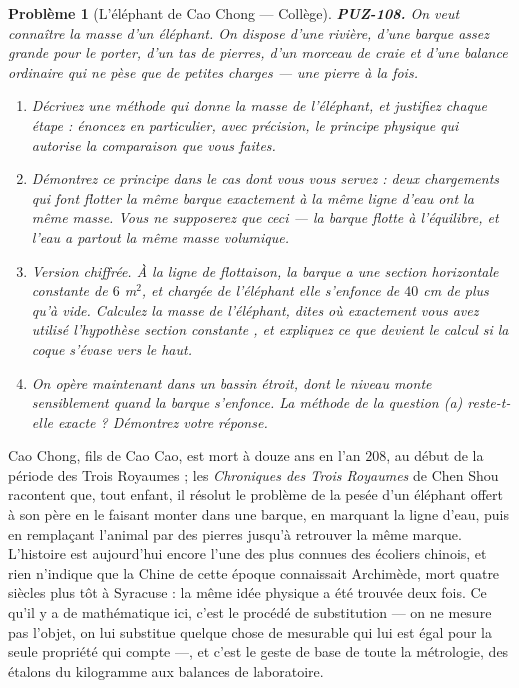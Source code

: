 \documentclass[11pt]{article}
\newtheorem{problem}{Problème}
\begin{document}
\begin{problem}[{L'éléphant de Cao Chong --- Collège}]
\textbf{PUZ-108.} On veut connaître la masse d'un éléphant. On dispose d'une rivière, d'une
barque assez grande pour le porter, d'un tas de pierres, d'un morceau de craie et d'une
balance ordinaire qui ne pèse que de petites charges --- une pierre à la fois.
\begin{enumerate}
\item[(a)] Décrivez une méthode qui donne la masse de l'éléphant, et justifiez chaque étape : énoncez
en particulier, avec précision, le principe physique qui autorise la comparaison que vous
faites.
\item[(b)] Démontrez ce principe dans le cas dont vous vous servez : deux chargements qui font
flotter la même barque exactement à la même ligne d'eau ont la même masse. Vous ne supposerez
que ceci --- la barque flotte à l'équilibre, et l'eau a partout la même masse volumique.
\item[(c)] Version chiffrée. À la ligne de flottaison, la barque a une section horizontale constante
de $ 6 $ m$^2$, et chargée de l'éléphant elle s'enfonce de $ 40 $ cm de plus qu'à vide.
Calculez la masse de l'éléphant, dites où exactement vous avez utilisé l'hypothèse \og{} section
constante \fg{}, et expliquez ce que devient le calcul si la coque s'évase vers le haut.
\item[(d)] On opère maintenant dans un bassin étroit, dont le niveau monte sensiblement quand la
barque s'enfonce. La méthode de la question (a) reste-t-elle exacte ? Démontrez votre
réponse.
\end{enumerate}

\end{problem}

\noindent Cao Chong, fils de Cao Cao, est mort à douze ans en l'an $ 208 $, au début
de la période des Trois Royaumes ; les \textit{Chroniques des Trois Royaumes} de Chen Shou
racontent que, tout enfant, il résolut le problème de la pesée d'un éléphant offert à son père
en le faisant monter dans une barque, en marquant la ligne d'eau, puis en remplaçant l'animal
par des pierres jusqu'à retrouver la même marque. L'histoire est aujourd'hui encore l'une des
plus connues des écoliers chinois, et rien n'indique que la Chine de cette époque connaissait
Archimède, mort quatre siècles plus tôt à Syracuse : la même idée physique a été trouvée deux
fois. Ce qu'il y a de mathématique ici, c'est le procédé de substitution --- on ne mesure pas
l'objet, on lui substitue quelque chose de mesurable qui lui est égal pour la seule propriété
qui compte ---, et c'est le geste de base de toute la métrologie, des étalons du kilogramme aux
balances de laboratoire.
\end{document}
